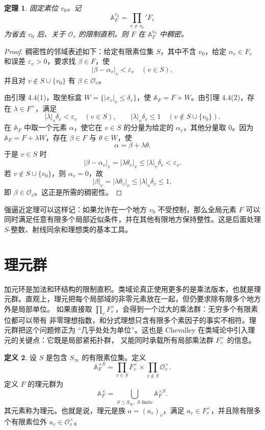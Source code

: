 \documentclass[11pt,a4paper,openany]{ctexbook}
\numberwithin{equation}{chapter}
\newcommand{\A}{\mathbb{A}}
\theoremstyle{plain}
\newtheorem{theorem}{定理}[chapter]
\theoremstyle{definition}
\newtheorem{definition}[theorem]{定义}
\theoremstyle{remark}
\begin{document}
\begin{theorem}
固定素位 $v_0$。记
\[
 \A_F^{v_0}=\prod_{v\ne v_0}'F_v
\]
为省去 $v_0$ 后、关于 $\mathcal O_v$ 的限制直积。则 $F$ 在 $\A_F^{v_0}$ 中稠密。
\end{theorem}

\begin{proof}
稠密性的邻域表述如下：给定有限素位集 $S$，其中不含 $v_0$，给定 $\alpha_v\in F_v$ 和误差 $\varepsilon_v>0$，要求找 $\beta\in F$，使
\[
 |\beta-\alpha_v|_v<\varepsilon_v\quad(v\in S),
\]
并且对 $v\notin S\cup\{v_0\}$ 有 $\beta\in\mathcal O_v$。

由引理 4.4(1)，取坐标盒 $W=\{|x_v|_v\le\delta_v\}$，使 $\A_F=F+W$。由引理 4.4(2)，存在 $\lambda\in F^\times$，满足
\[
 |\lambda|_v\delta_v<\varepsilon_v\quad(v\in S),\qquad
 |\lambda|_v\delta_v\le1\quad(v\notin S\cup\{v_0\}).
\]
在 $\A_F$ 中取一个元素 $\alpha$，使它在 $v\in S$ 的分量为给定的 $\alpha_v$，其他分量取 $0$。因为 $\A_F=F+\lambda W$，存在 $\beta\in F$ 与 $\theta\in W$，使
\[
 \alpha=\beta+\lambda\theta.
\]
于是 $v\in S$ 时
\[
 |\beta-\alpha_v|_v=|\lambda\theta_v|_v\le|\lambda|_v\delta_v<\varepsilon_v.
\]
若 $v\notin S\cup\{v_0\}$，则 $\alpha_v=0$，故
\[
 |\beta|_v=|\lambda\theta_v|_v\le|\lambda|_v\delta_v\le1,
\]
即 $\beta\in\mathcal O_v$。这正是所需的稠密性。
\end{proof}

强逼近定理可以这样记：如果允许在一个地方 $v_0$ 不受控制，那么全局元素 $F$ 可以同时满足任意有限多个局部近似条件，并在其他有限地方保持整性。这是后面处理 $S$-整数、射线同余和理想类的基本工具。

\section{理元群}

加元环是加法和环结构的限制直积。类域论真正使用更多的是乘法版本，也就是理元群。直观上，理元把每个局部域的非零元素放在一起，但仍要求除有限多个地方外是局部单位。
如果直接取 $\prod_vF_v^\times$，会得到一个过大的乘法群：无穷多个有限素位都可以带有
非零理想指数，和分式理想只含有限多个素因子的事实不相符。理元群把这个问题修正为
“几乎处处为单位”。这也是 Chevalley 在类域论中引入理元的关键点：它既是局部紧拓扑群，
又能同时承载所有局部乘法群 $F_v^\times$ 的信息。

\begin{definition}
设 $S$ 是包含 $S_\infty$ 的有限素位集。定义
\[
 \A_F^{\times S}=\prod_{v\in S}F_v^\times\times\prod_{v\notin S}\mathcal O_v^\times.
\]
定义 $F$ 的理元群为
\[
 \A_F^\times=\bigcup_{S\supset S_\infty,\;S\text{ finite}}\A_F^{\times S}.
\]
其元素称为理元。也就是说，理元是族 $a=(a_v)_v$，满足 $a_v\in F_v^\times$，并且除有限多个有限素位外 $a_v\in\mathcal O_v^\times$。
\end{definition}
\end{document}
